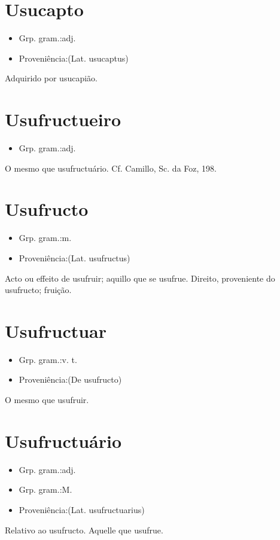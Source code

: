 \documentclass{article}
\begin{document}
\section{Usucapto}
\begin{itemize}
\item {Grp. gram.:adj.}
\end{itemize}
\begin{itemize}
\item {Proveniência:(Lat. \textunderscore usucaptus\textunderscore )}
\end{itemize}
Adquirido por usucapião.
\section{Usufructueiro}
\begin{itemize}
\item {Grp. gram.:adj.}
\end{itemize}
O mesmo que \textunderscore usufructuário\textunderscore . Cf. Camillo, \textunderscore Sc. da Foz\textunderscore , 198.
\section{Usufructo}
\begin{itemize}
\item {Grp. gram.:m.}
\end{itemize}
\begin{itemize}
\item {Proveniência:(Lat. \textunderscore usufructus\textunderscore )}
\end{itemize}
Acto ou effeito de usufruir; aquillo que se usufrue.
Direito, proveniente do usufructo; fruição.
\section{Usufructuar}
\begin{itemize}
\item {Grp. gram.:v. t.}
\end{itemize}
\begin{itemize}
\item {Proveniência:(De \textunderscore usufructo\textunderscore )}
\end{itemize}
O mesmo que \textunderscore usufruir\textunderscore .
\section{Usufructuário}
\begin{itemize}
\item {Grp. gram.:adj.}
\end{itemize}
\begin{itemize}
\item {Grp. gram.:M.}
\end{itemize}
\begin{itemize}
\item {Proveniência:(Lat. \textunderscore usufructuarius\textunderscore )}
\end{itemize}
Relativo ao usufructo.
Aquelle que usufrue.
\end{document}
